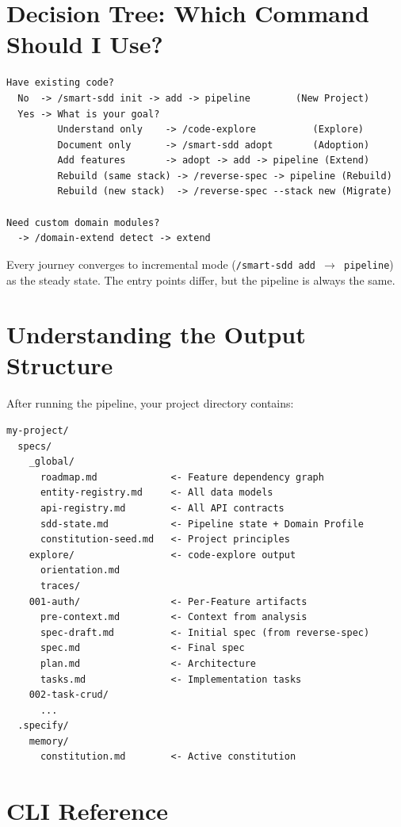 \documentclass[11pt,a4paper,openright,twoside]{report}
\begin{document}
\section{Decision Tree: Which Command Should I Use?}

\begin{lstlisting}[title={Command Selection Decision Tree}]
Have existing code?
  No  -> /smart-sdd init -> add -> pipeline        (New Project)
  Yes -> What is your goal?
         Understand only    -> /code-explore          (Explore)
         Document only      -> /smart-sdd adopt       (Adoption)
         Add features       -> adopt -> add -> pipeline (Extend)
         Rebuild (same stack) -> /reverse-spec -> pipeline (Rebuild)
         Rebuild (new stack)  -> /reverse-spec --stack new (Migrate)

Need custom domain modules?
  -> /domain-extend detect -> extend
\end{lstlisting}

Every journey converges to incremental mode (\texttt{/smart-sdd add $\rightarrow$ pipeline}) as the steady state. The entry points differ, but the pipeline is always the same.

\section{Understanding the Output Structure}

After running the pipeline, your project directory contains:

\begin{lstlisting}[title={Output Directory Structure}]
my-project/
  specs/
    _global/
      roadmap.md             <- Feature dependency graph
      entity-registry.md     <- All data models
      api-registry.md        <- All API contracts
      sdd-state.md           <- Pipeline state + Domain Profile
      constitution-seed.md   <- Project principles
    explore/                 <- code-explore output
      orientation.md
      traces/
    001-auth/                <- Per-Feature artifacts
      pre-context.md         <- Context from analysis
      spec-draft.md          <- Initial spec (from reverse-spec)
      spec.md                <- Final spec
      plan.md                <- Architecture
      tasks.md               <- Implementation tasks
    002-task-crud/
      ...
  .specify/
    memory/
      constitution.md        <- Active constitution
\end{lstlisting}

\section{CLI Reference}
\end{document}
